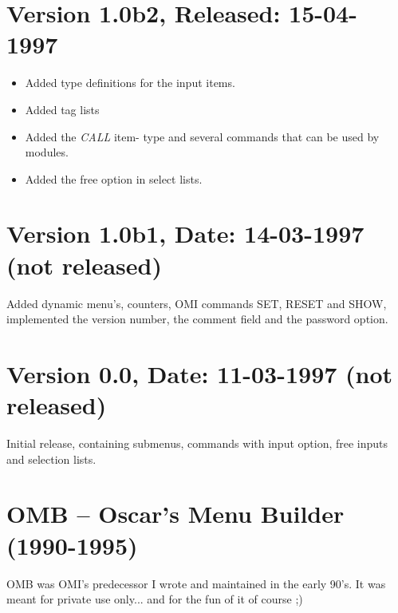 \documentclass[a4paper]{book}
\begin{document}
\section*{Version 1.0b2, Released: 15-04-1997}

\begin{itemize}
\item Added type definitions for the input items.
\item Added tag lists
\item Added the \textsl{CALL} item- type and several commands that can be used by modules.
\item Added the free option in select lists.
\end{itemize}

\section*{Version 1.0b1, Date: 14-03-1997  (not released)}

Added dynamic menu's, counters, OMI commands \textsf{SET}, \textsf{RESET} and \textsf{SHOW}, implemented the version number, the comment field and the password option.

\section*{Version 0.0, Date: 11-03-1997  (not released)}

Initial release, containing submenus, commands with input option, free inputs and selection lists.

\section*{OMB -- Oscar's Menu Builder (1990-1995)}

OMB was OMI's predecessor I wrote and maintained in the early 90's. It was meant for private use only... and for the fun of it of course ;)

\cleardoublepage
\printindex
\end{document}
